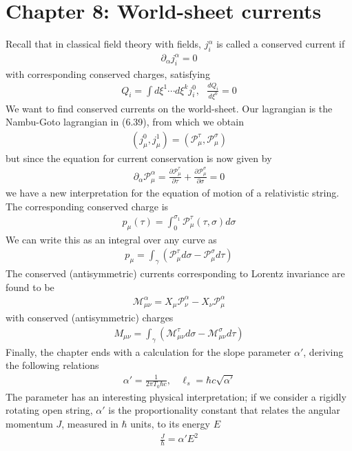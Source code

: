 \documentclass[11pt]{article}
\begin{document}
\section*{Chapter 8: World-sheet currents}
Recall that in classical field theory with fields, $j^\alpha_i$ is called a conserved current if
\begin{align*}
    \partial_\alpha j^\alpha_i = 0 \tag{8.23}
\end{align*}
with corresponding conserved charges, satisfying
\begin{align*}
    Q_i = \int d \xi^1 \cdots d\xi^k j^0_i, ~~~ \frac{dQ_i}{d\xi^0} = 0 \tag{8.25, 8.26}
\end{align*}
We want to find conserved currents on the world-sheet. Our lagrangian is the Nambu-Goto lagrangian in (6.39), from which we obtain 
\begin{align*}
    (j^0_\mu, j^1_\mu) = (\mathcal{P}^\tau_\mu, \mathcal{P}^\sigma_\mu) \tag{8.34}
\end{align*}
but since the equation for current conservation is now given by 
\begin{align*}
    \partial_\alpha \mathcal{P}^\alpha_\mu = \frac{\partial \mathcal{P}^\tau_\mu}{\partial \tau} + \frac{\partial \mathcal{P}^\sigma_\mu}{\partial \sigma} = 0 \tag{8.35}
\end{align*}
we have a new interpretation for the equation of motion of a relativistic string. The corresponding conserved charge is 
\begin{align*}
    p_\mu(\tau) = \int_0^{\sigma_1} \mathcal{P}^\tau_\mu (\tau, \sigma) d\sigma \tag{8.36}
\end{align*}
We can write this as an integral over any curve as 
\begin{align*}
    p_\mu = \int_\gamma (\mathcal{P}^\tau_\mu d\sigma - \mathcal{P}^\sigma_\mu d\tau) \tag{8.49}
\end{align*}
The conserved (antisymmetric) currents corresponding to Lorentz invariance are found to be 
\begin{align*}
    \mathcal{M}^\alpha_{\mu\nu} = X_\mu \mathcal{P}^\alpha_\nu - X_\nu \mathcal{P}^\alpha_\mu \tag{8.60}
\end{align*}
with conserved (antisymmetric) charges 
\begin{align*}
    M_{\mu\nu} = \int_\gamma (\mathcal{M}^\tau_{\mu\nu}d\sigma - \mathcal{M}^\sigma_{\mu\nu} d\tau) \tag{8.63}
\end{align*}
Finally, the chapter ends with a calculation for the slope parameter $\alpha'$, deriving the following relations 
\begin{align*}
    \alpha' = \frac{1}{2\pi T_0 \hbar c}, ~~~~ \ell_s = \hbar c \sqrt{\alpha '} \tag{8.76, 8.78}
\end{align*}
The parameter has an interesting physical interpretation; if we consider a rigidly rotating open string, $\alpha'$ is the proportionality constant that relates the angular momentum $J$, measured in $\hbar$ units, to its energy $E$ 
\begin{align*}
    \frac{J}{\hbar} = \alpha' E^2 \tag{8.69}
\end{align*}
\end{document}
